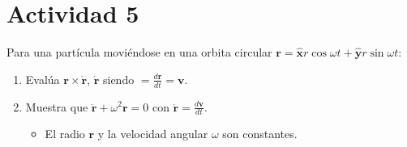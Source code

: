 \documentclass{article}
\begin{document}
\section{Actividad 5}
Para una partícula moviéndose en una orbita circular $\pmb{r} = \pmb{\hat{x}}r\cos\omega t + \pmb{\hat{y}}r\sin\omega t$:
\begin{enumerate}
  \item Evalúa $\pmb{r}\times \pmb{\dot{r}}$, $\pmb{\dot{r}}$ siendo $= \frac{d\pmb{r}}{dt}=\pmb{v}$.
  \item Muestra que $\pmb{\ddot{r}}+\omega^2 \pmb{r}=0$ con $\pmb{\ddot{r}}=\frac{d\pmb{v}}{dt}$. 
  \begin{itemize}
    \item El radio $\pmb{r}$ y la velocidad angular $\omega$ son constantes.
  \end{itemize}
\end{enumerate}
\end{document}
